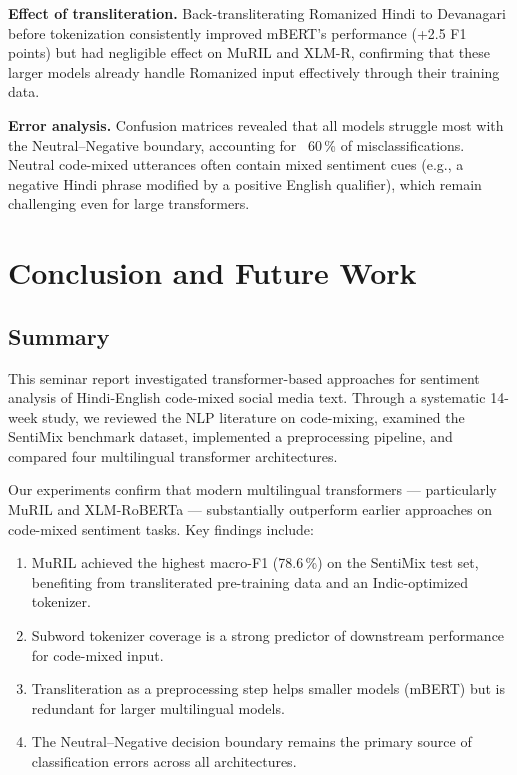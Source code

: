 \documentclass[12pt,a4paper]{report}
\begin{document}
\textbf{Effect of transliteration.} Back-transliterating Romanized Hindi to Devanagari before tokenization consistently improved mBERT's performance (+2.5 F1 points) but had negligible effect on MuRIL and XLM-R, confirming that these larger models already handle Romanized input effectively through their training data.

\textbf{Error analysis.} Confusion matrices revealed that all models struggle most with the Neutral--Negative boundary, accounting for ~60\,\% of misclassifications. Neutral code-mixed utterances often contain mixed sentiment cues (e.g., a negative Hindi phrase modified by a positive English qualifier), which remain challenging even for large transformers.

\chapter{Conclusion and Future Work}

\section{Summary}

This seminar report investigated transformer-based approaches for sentiment analysis of Hindi-English code-mixed social media text. Through a systematic 14-week study, we reviewed the NLP literature on code-mixing, examined the SentiMix benchmark dataset, implemented a preprocessing pipeline, and compared four multilingual transformer architectures.

Our experiments confirm that modern multilingual transformers — particularly MuRIL and XLM-RoBERTa — substantially outperform earlier approaches on code-mixed sentiment tasks. Key findings include:

\begin{enumerate}[nosep,itemsep=3pt]
  \item MuRIL achieved the highest macro-F1 (78.6\,\%) on the SentiMix test set, benefiting from transliterated pre-training data and an Indic-optimized tokenizer.
  \item Subword tokenizer coverage is a strong predictor of downstream performance for code-mixed input.
  \item Transliteration as a preprocessing step helps smaller models (mBERT) but is redundant for larger multilingual models.
  \item The Neutral--Negative decision boundary remains the primary source of classification errors across all architectures.
\end{enumerate}
\end{document}
